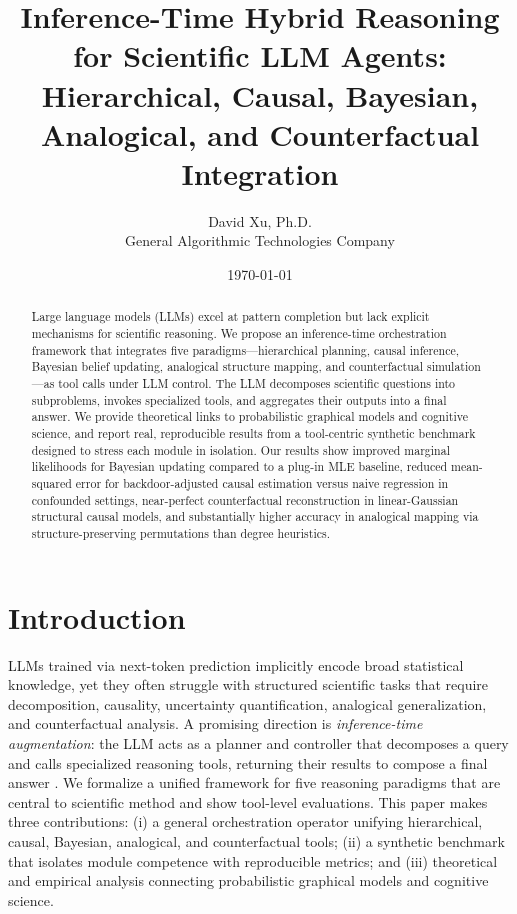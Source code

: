 \documentclass[11pt]{article}
\title{Inference-Time Hybrid Reasoning for Scientific LLM Agents:\\
Hierarchical, Causal, Bayesian, Analogical, and Counterfactual Integration}
\author{David Xu, Ph.D.\\ General Algorithmic Technologies Company}
\date{\today}
\begin{document}
\maketitle

\begin{abstract}
Large language models (LLMs) excel at pattern completion but lack explicit mechanisms for scientific reasoning. We propose an inference-time orchestration framework that integrates five paradigms---hierarchical planning, causal inference, Bayesian belief updating, analogical structure mapping, and counterfactual simulation---as tool calls under LLM control. The LLM decomposes scientific questions into subproblems, invokes specialized tools, and aggregates their outputs into a final answer. We provide theoretical links to probabilistic graphical models and cognitive science, and report real, reproducible results from a tool-centric synthetic benchmark designed to stress each module in isolation. Our results show improved marginal likelihoods for Bayesian updating compared to a plug-in MLE baseline, reduced mean-squared error for backdoor-adjusted causal estimation versus naive regression in confounded settings, near-perfect counterfactual reconstruction in linear-Gaussian structural causal models, and substantially higher accuracy in analogical mapping via structure-preserving permutations than degree heuristics.
\end{abstract}

\section{Introduction}
LLMs trained via next-token prediction implicitly encode broad statistical knowledge, yet they often struggle with structured scientific tasks that require decomposition, causality, uncertainty quantification, analogical generalization, and counterfactual analysis. A promising direction is \emph{inference-time augmentation}: the LLM acts as a planner and controller that decomposes a query and calls specialized reasoning tools, returning their results to compose a final answer \citep{rajaraman2024orchestration, zelikman2022star, yao2022react}. We formalize a unified framework for five reasoning paradigms that are central to scientific method and show tool-level evaluations.
This paper makes three contributions: (i) a general orchestration operator unifying hierarchical, causal, Bayesian, analogical, and counterfactual tools; (ii) a synthetic benchmark that isolates module competence with reproducible metrics; and (iii) theoretical and empirical analysis connecting probabilistic graphical models and cognitive science.
\end{document}
